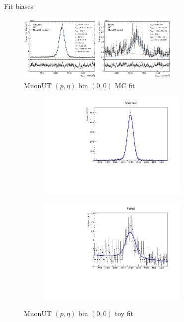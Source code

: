 \documentclass[xcolor={dvipsnames}]{beamer}
\begin{document}
\begin{frame}{Fit biases}
  \vspace{0.0cm}
  \begin{figure}[htb]
    \centering
    \includegraphics[width=0.7\textwidth]{Plots/MC_MuonUT_P_bin_0_ETA_bin_0_sim.pdf}
    \caption*{\small MuonUT $(p, \eta)$ bin $(0, 0)$ MC fit}
  \end{figure}
  \vspace{-0.5cm}
  \begin{figure}[htb]
    \centering
    \begin{subfigure}{0.45\textwidth}
      \centering
      \includegraphics[width=0.8\textwidth]{Plots/matched_projection_MuonUT_P0_ETA0.pdf}
    \end{subfigure}%
    \begin{subfigure}{0.45\textwidth}
      \centering
      \includegraphics[width=0.8\textwidth]{Plots/failed_projection_MuonUT_P0_ETA0.pdf}
    \end{subfigure}
    \vspace{-0.2cm}
    \caption*{\small MuonUT $(p, \eta)$ bin $(0, 0)$ toy fit}
  \end{figure}
\end{frame}
\end{document}
